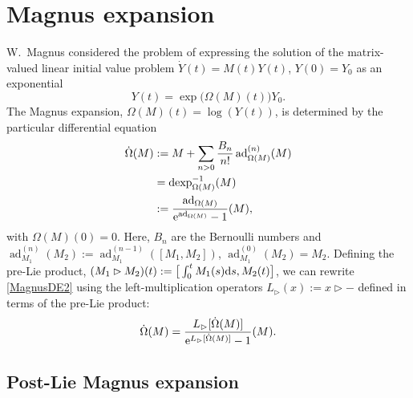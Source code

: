 \documentclass[pdftex]{sigma}
\numberwithin{equation}{section}
\begin{document}
\section{Magnus expansion}\label{s3}

W.~Magnus \cite{WM54} considered the problem of expressing the solution of the matrix-valued linear initial value problem $\dot Y(t) = M(t)Y(t)$, $Y(0)=Y_0$ as an exponential \cite{BCOR08,MP1970}
\begin{displaymath}
Y(t)=\exp\big({\Omega}(M)(t)\big)Y_0.
\end{displaymath}
The Magnus expansion, ${\Omega}(M)(t)=\log (Y(t))$, is determined by the particular differential equation
\begin{align}
\dot{\Omega}(M) &:=M + \sum_{n>0} \frac{B_n}{n!} \operatorname{ad}_{{\Omega}(M)}^{(n)}(M) \label{MagnusDE1}\\
 &= \operatorname{dexp}^{-1}_{\Omega(M)}(M) \nonumber\\
 &:= \frac{\operatorname{ad}_{\Omega(M)}}{{\rm e}^{\operatorname{ad}_{\Omega(M)}} - 1}(M) \label{MagnusDE2},
\end{align}
with $\Omega(M)(0)=0$. Here, $B_n$ are the Bernoulli numbers and $\operatorname{ad}_{M_1}^{(n)}(M_2):=\operatorname{ad}_{M_1}^{(n-1)}([M_1,M_2])$, $\operatorname{ad}_{M_1}^{(0)}(M_2)=M_2$. Defining the pre-Lie product, $(M_1 \rhd M_2)(t):=\big[\int_0^tM_1(s){\rm d}s,M_2(t)\big]$, we can rewrite \eqref{MagnusDE2} using the left-multiplication operators $L_\rhd(x):=x\rhd -$ defined in terms of the pre-Lie product:
\begin{displaymath}
\dot{\Omega}(M) = \frac{L_\rhd[{\dot{\Omega}(M)}]}{{\rm e}^{L_\rhd[{\dot{\Omega}(M)}]} - 1}(M).
\end{displaymath}

\subsection{Post-Lie Magnus expansion}
\end{document}
